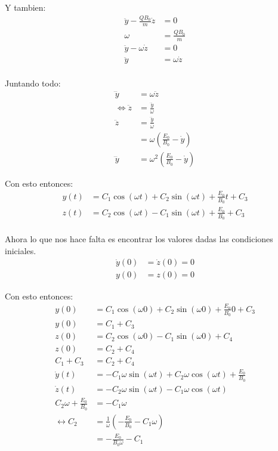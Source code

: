 \documentclass{report}
\begin{document}
Y tambien:
\begin{align*}
	\ddot{y} - \frac{Q B_0}{m} \dot{z} &= 0\\
	\omega &= \frac{Q B_0}{m}\\
	\ddot{y} - \omega \dot{z} &= 0\\
	\ddot{y} &= \omega \dot{z}\\
\end{align*}

Juntando todo:
\begin{align*}
	\dddot{y} &= \omega \ddot{z} \\
	\iff \ddot{z} &= \frac{\dddot{y}}{\omega}\\
	\ddot{z} &= \frac{\dddot{y}}{\omega}\\
	&= \omega \left( \frac{E_0}{B_0} - \dot{y} \right)\\
	\dddot{y} &= \omega^2 \left( \frac{E_0}{B_0} - \dot{y} \right)
\end{align*}

Con esto entonces:
\begin{align*}
	y(t) &= C_1 \cos \left(\omega t \right) + C_2 \sin\left( \omega t \right) + \frac{E_0}{B_0} t + C_3\\
	z(t) &= C_2 \cos \left(\omega t \right) - C_1 \sin\left( \omega t \right) + \frac{E_0}{B_0} + C_3\\
\end{align*}

Ahora lo que nos hace falta es encontrar los valores dadas las condiciones iniciales.
\begin{align*}
	\dot{y} (0) &= \dot{z} (0) = 0\\
	y(0) &= z(0) = 0
\end{align*}

Con esto entonces:
\begin{align*}
	y(0) &= C_1 \cos \left(\omega 0 \right) + C_2 \sin\left( \omega 0 \right) + \frac{E_0}{B_0} 0 + C_3\\
	y(0) &= C_1 + C_3\\
	z(0) &= C_2 \cos \left(\omega 0 \right) - C_1 \sin\left( \omega 0 \right) + C_4\\
	z(0) &= C_2 + C_4\\
	C_1 + C_3 &= C_2 + C_4\\
	\dot{y}(t) &= - C_1\omega \sin \left(\omega t \right) + C_2 \omega\cos\left( \omega t \right) + \frac{E_0}{B_0}\\
	\dot{z}(t) &= - C_2\omega \sin \left(\omega t \right) - C_1 \omega\cos\left( \omega t \right)\\
	C_2 \omega + \frac{E_0}{B_0} &= - C_1 \omega\\
	\leftrightarrow C_2 &= \frac{1}{\omega} \left( - \frac{E_0}{B_0} - C_1 \omega\right)\\
	&= - \frac{E_0}{B_0 \omega} - C_1\\
\end{align*}
\end{document}
